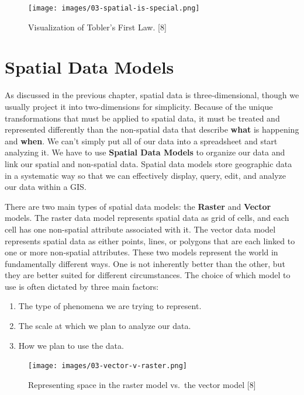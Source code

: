 \documentclass[
]{book}
\providecommand{\tightlist}{%
  \setlength{\itemsep}{0pt}\setlength{\parskip}{0pt}}
\begin{document}
\begin{figure}
\centering
\texttt{[image: images/03-spatial-is-special.png]}
\caption{Visualization of Tobler's First Law. {[}8{]}}
\end{figure}

\hypertarget{spatial-data-models}{%
\section{Spatial Data Models}\label{spatial-data-models}}

As discussed in the previous chapter, spatial data is three-dimensional, though we usually project it into two-dimensions for simplicity. Because of the unique transformations that must be applied to spatial data, it must be treated and represented differently than the non-spatial data that describe \textbf{what} is happening and \textbf{when}. We can't simply put all of our data into a spreadsheet and start analyzing it. We have to use \textbf{Spatial Data Models} to organize our data and link our spatial and non-spatial data. Spatial data models store geographic data in a systematic way so that we can effectively display, query, edit, and analyze our data within a GIS.

There are two main types of spatial data models: the \textbf{Raster} and \textbf{Vector} models. The raster data model represents spatial data as grid of cells, and each cell has one non-spatial attribute associated with it. The vector data model represents spatial data as either points, lines, or polygons that are each linked to one or more non-spatial attributes. These two models represent the world in fundamentally different ways. One is not inherently better than the other, but they are better suited for different circumstances. The choice of which model to use is often dictated by three main factors:

\begin{enumerate}
\def\labelenumi{\arabic{enumi})}
\tightlist
\item
  The type of phenomena we are trying to represent.
\item
  The scale at which we plan to analyze our data.
\item
  How we plan to use the data.
\end{enumerate}

\begin{figure}
\centering
\texttt{[image: images/03-vector-v-raster.png]}
\caption{Representing space in the raster model vs.~the vector model {[}8{]}}
\end{figure}
\end{document}
